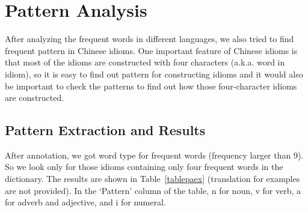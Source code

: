 \section{Pattern Analysis}
After analyzing the frequent words in different languages, we also tried to find frequent pattern in Chinese idioms. One important feature of Chinese idioms is that most of the idioms are constructed with four characters (a.k.a. word in idiom), so it is easy to find out pattern for constructing idioms and it would also be important to check the patterns to find out how those four-character idioms are constructed. 

\subsection{Pattern Extraction and Results}
After annotation, we got word type for frequent words (frequency larger than 9). So we look only for those idioms containing only four frequent words in the dictionary. The results are shown in Table~\ref{tablepaex} (translation for examples are not provided). In the `Pattern' column of the table, n for noun, v for verb, a for adverb and adjective, and i for numeral. 

